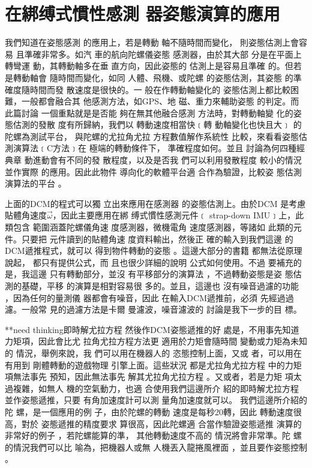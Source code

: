 \documentclass[12pt,twoside]{article}
\begin{document}
\begin{figure}[th]
\caption{{}}
\begin{center}

\end{center}
\end{figure}

\part{在綁缚式慣性感測%
器姿態演算的應用}

我們知道在姿態感測%
的應用上，若是轉動%
軸不隨時間而變化，%
則姿態估測上會容易%
且準確非常多。如汽%
車的航向陀螺儀姿態%
感測器，由於其大部%
分是在平面上轉彎運%
動，其轉動軸多在垂%
直方向，因此姿態的%
估測上是容易且準確%
的。但若是轉動軸會%
隨時間而變化，如同%
人體、飛機、或陀螺%
的姿態估測，其姿態%
的準確度隨時間而發%
散速度是很快的。一%
般在作轉動軸變化的%
姿態估測上都比較困%
難，一般都會融合其%
他感測方法，如GPS、地%
磁、重力來輔助姿態%
的判定。而此篇討論%
一個重點就是是否能%
夠在無其他融合感測%
方法時，對轉動軸變%
化的姿態估測的發散%
度有所歸納，我們以%
轉動速度相當快﹝轉%
動軸變化也快且大﹞%
的陀螺為測試平台，%
與陀螺的尤拉角尤拉%
方程數值解作系統性%
比較，來看看姿態估%
測演算法﹝C方法﹞在%
極端的轉動條件下，%
準確程度如何。並且%
討論為何四種經典章%
動進動會有不同的發%
散程度，以及是否我%
們可以利用發散程度%
較小的情況並作實際%
的應用。因此此物件%
導向化的軟體平台適%
合作為驗證，比較姿%
態估測演算法的平台%
。

\bigskip

上面的DCM的程式可以獨%
立出來應用在感測器%
的姿態估測上。由於DCM%
是考慮貼體角速度$\vec{\omega}
$，因此主要應用在綁%
缚式慣性感測元件﹝%
strap-down IMU﹞上，此類包含%
範圍涵蓋陀螺儀角速%
度感測器，微機電角%
速度感測器，等諸如%
此類的元件。只要把%
元件讀到的貼體角速%
度資料輸出，然後正%
確的輸入到我們這邊%
的DCM遞推程式，就可以%
得到物件轉動的姿態%
。這邊大部分的書籍%
都無法從原理說起，%
都只有提供公式，而%
且也很少詳細的說明%
公式如何使用。不過%
要補充的是，我這邊%
只有轉動部分，並沒%
有平移部分的演算法%
，不過轉動姿態是姿%
態估測的基礎，平移%
的演算是相對容易很%
多的。並且，這邊也%
沒有噪音過濾的功能%
，因為任何的量測儀%
器都會有噪音，因此%
在輸入DCM遞推前，必須%
先經過過濾。一般常%
見的過濾方法是卡爾%
曼濾波，噪音濾波的%
討論是我下一步的目%
標。

**need thinking即時解尤拉方程%
然後作DCM姿態遞推的好%
處是，不用事先知道%
力矩項，因此會比尤%
拉角尤拉方程方法更%
適用於力矩會隨時間%
變動或力矩為未知的%
情況，舉例來說，我%
們可以用在機器人的%
恣態控制上面，又或%
者，可以用在有用到%
剛體轉動的遊戲物理%
引擎上面。這些狀況%
都是尤拉角尤拉方程%
中的力矩項無法事先%
預知，因此無法事先%
解其尤拉角尤拉方程%
。又或者，若是力矩%
項太過複雜，如無人%
機的空氣動力，也適%
合使用我們這邊所介%
紹的即時解尤拉方程%
並作姿態遞推，只要%
有角加速度計可以測%
量角加速度就可以。%
我們這邊所介紹的陀%
螺，是一個應用的例%
子，由於陀螺的轉動%
速度是每秒20轉，因此%
轉動速度很高，對於%
姿態遞推的精度要求%
算很高，因此陀螺適%
合當作驗證姿態遞推%
演算的非常好的例子%
，若陀螺能算的準，%
其他轉動速度不高的%
情況將會非常準。陀%
螺的情況我們可以比%
喻為，把機器人或無%
人機丟入龍捲風裡面%
，並且要作姿態控制%
。
\end{document}
